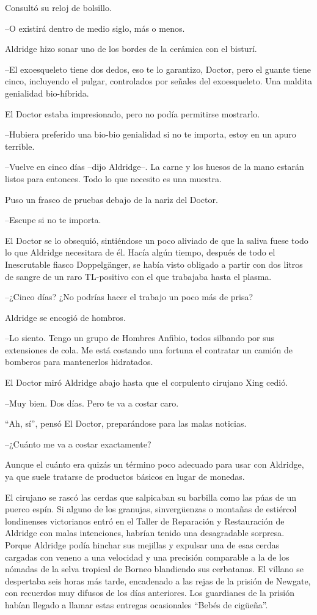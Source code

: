 Consultó su reloj de bolsillo. 

--O existirá dentro de medio siglo, más o menos.

Aldridge hizo sonar uno de los bordes de la cerámica con el bisturí. 

--El exoesqueleto tiene dos dedos, eso te lo garantizo, Doctor, pero el guante tiene cinco, incluyendo el pulgar, controlados por señales del exoesqueleto. Una maldita genialidad bio-híbrida.

El Doctor estaba impresionado, pero no podía permitirse mostrarlo. 

--Hubiera preferido una bio-bio genialidad si no te importa, estoy en un apuro terrible.

--Vuelve en cinco días --dijo Aldridge--. La carne y los huesos de la mano estarán listos para entonces. Todo lo que necesito es una muestra. 

Puso un frasco de pruebas debajo de la nariz del Doctor. 

--Escupe si no te importa.

El Doctor se lo obsequió, sintiéndose un poco aliviado de que la saliva fuese todo lo que Aldridge necesitara de él. Hacía algún tiempo, después de todo el Inescrutable fiasco Doppelgänger, se había visto obligado a partir con dos litros de sangre de un raro TL-positivo con el que trabajaba hasta el plasma.

--¿Cinco días? ¿No podrías hacer el trabajo un poco más de prisa?

\mbox{}

Aldridge se encogió de hombros.

--Lo siento. Tengo un grupo de Hombres Anfibio, todos silbando por sus extensiones de cola. Me está costando una fortuna el contratar un camión de bomberos para mantenerlos hidratados.

El Doctor miró Aldridge abajo hasta que el corpulento cirujano Xing cedió.

--Muy bien. Dos días. Pero te va a costar caro.

``Ah, sí'', pensó El Doctor, preparándose para las malas noticias.

--¿Cuánto me va a costar exactamente?

Aunque el cuánto era quizás un término poco adecuado para usar con Aldridge, ya que suele tratarse de productos básicos en lugar de monedas.

\mbox{}

El cirujano se rascó las cerdas que salpicaban su barbilla como las púas de un puerco espín. Si alguno de los granujas, sinvergüenzas o montañas de estiércol londinenses victorianos entró en el Taller de Reparación y Restauración de Aldridge con malas intenciones, habrían tenido una desagradable sorpresa. Porque Aldridge podía hinchar sus mejillas y expulsar una de esas cerdas cargadas con veneno a una velocidad y una precisión comparable a la de los nómadas de la selva tropical de Borneo blandiendo sus cerbatanas. El villano se despertaba seis horas más tarde, encadenado a las rejas de la prisión de Newgate, con recuerdos muy difusos de los días anteriores. Los guardianes de la prisión habían llegado a llamar estas entregas ocasionales ``Bebés de cigüeña''.

